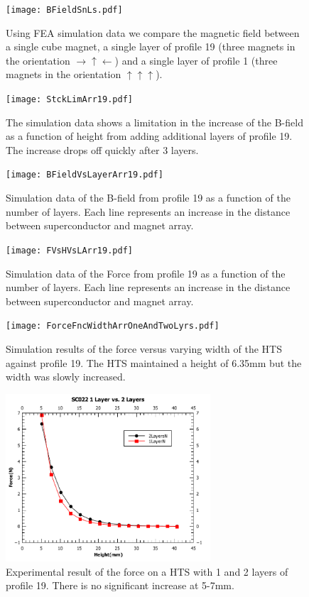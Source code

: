 \begin{figure}[htbp]
\centering
\texttt{[image: BFieldSnLs.pdf]}
\caption{Using FEA simulation data we compare the magnetic field between a single cube magnet, a single layer of profile 19 (three magnets in the orientation $\rightarrow\uparrow\leftarrow$) and a single layer of profile 1 (three magnets in the orientation $\uparrow\uparrow\uparrow$).}
\label{fig_BFieldSnLs}
\end{figure}

\begin{figure}[htbp]
\centering
\texttt{[image: StckLimArr19.pdf]}
\caption{The simulation data shows a limitation in the increase of the B-field as a function of height from adding additional layers of profile 19.  The increase  drops off quickly after 3 layers.}
\label{fig_StckLimArr19}
\end{figure}

\begin{figure}[htbp]
\centering
\texttt{[image: BFieldVsLayerArr19.pdf]}
\caption{Simulation data of the B-field from profile 19 as a function of the number of layers.  Each line represents an increase in the distance between superconductor and magnet array.}
\label{fig_BFieldVsLayerArr19}
\end{figure}

\begin{figure}[htbp]
\centering
\texttt{[image: FVsHVsLArr19.pdf]}
\caption{Simulation data of the Force from profile 19 as a function of the number of layers.  Each line represents an increase in the distance between superconductor and magnet array.}
\label{fig_ForceVsLayerArr19}
\end{figure}

\begin{figure}[htbp]
\centering
\texttt{[image: ForceFncWidthArrOneAndTwoLyrs.pdf]}
\caption{Simulation results of the force versus varying width of the HTS against profile 19.  The HTS maintained a height of 6.35mm but the width was slowly increased. }
\label{fig_ForceWidthArr19}
\end{figure}

\begin{figure}[htbp]
\centering
\includegraphics[width=3in]{figures/SC0221LayerVs2Layers.pdf}
\caption{Experimental result of the force on a HTS with 1 and 2 layers of profile 19. There is no significant increase at 5-7mm.}
\label{fig_1layervs2}
\end{figure}

